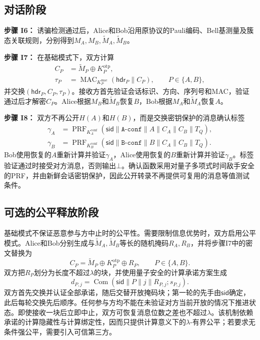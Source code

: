 \documentclass[UTF8,10pt,a4paper]{ctexart}
\theoremstyle{aqdplain}
\newcommand{\sid}{\mathsf{sid}}
\newcommand{\concat}{\mathbin{\|}}
\newcommand{\abort}{\bot}
\begin{document}
\subsection{对话阶段}

\textbf{步骤 I6：} 诱骗检测通过后，Alice和Bob沿用原协议的Pauli编码、Bell基测量及簇态关联规则，分别得到$M_A,M_B,\widetilde M_A,\widetilde M_B$。

\textbf{步骤 I7：} 在基础模式下，双方计算
\begin{align}
C_P&=\widetilde M_P\oplus K_P^{\mathrm{otp}},\nonumber\\
\tau_P&=\operatorname{MAC}_{K_P^{\mathrm{mac}}}
(\mathsf{hdr}_P\concat C_P),
\qquad P\in\{A,B\},
\label{eq:records}
\end{align}
并交换$(\mathsf{hdr}_P,C_P,\tau_P)$。接收方首先验证会话标识、方向、序列号和MAC，验证通过后才解密$C_P$。Alice根据$M_B$和$\widetilde M_B$恢复$B$，Bob根据$M_A$和$\widetilde M_A$恢复$A$。

\textbf{步骤 I8：} 双方不再公开$H(A)$和$H(B)$，而是交换密钥保护的消息确认标签
\begin{align}
\gamma_A&=\operatorname{PRF}_{K_A^{\mathrm{conf}}}
(\sid\concat\mathtt{A\mbox{-}conf}\concat A
\concat C_A\concat C_B\concat T_Q),\nonumber\\
\gamma_B&=\operatorname{PRF}_{K_B^{\mathrm{conf}}}
(\sid\concat\mathtt{B\mbox{-}conf}\concat B
\concat C_A\concat C_B\concat T_Q).
\label{eq:confirmation}
\end{align}
Bob使用恢复的$A$重新计算并验证$\gamma_A$，Alice使用恢复的$B$重新计算并验证$\gamma_B$。标签验证通过时接受对方消息，否则输出$\abort$。确认函数采用对量子多项式时间敌手安全的PRF，并由新鲜会话密钥保护，因此公开转录不再提供可复用的消息等值测试条件。

\subsection{可选的公平释放阶段}

基础模式不保证恶意参与方中止时的公平性。需要限制信息优势时，双方启用公平模式。Alice和Bob分别生成与$\widetilde M_A,\widetilde M_B$等长的随机掩码$R_A,R_B$，并将步骤I7中的密文替换为
\begin{equation}
C_P=\widetilde M_P\oplus K_P^{\mathrm{otp}}\oplus R_P,
\qquad P\in\{A,B\}.
\label{eq:masked-records}
\end{equation}
双方把$R_P$划分为长度不超过$\lambda$的块，并使用量子安全的计算承诺方案生成
\begin{equation}
d_{P,j}=\operatorname{Com}
(\sid\concat P\concat j\concat R_{P,j};s_{P,j}).
\label{eq:commitment}
\end{equation}
双方首先交换并认证全部承诺，随后交替开放掩码块；第一轮的先手由$\sid$确定，此后每轮交换先后顺序。任何参与方均不能在未验证对方当前开放的情况下推进状态。即使接收一块后立即中止，双方可恢复消息位数之差也不超过$\lambda$。该机制依赖承诺的计算隐藏性与计算绑定性，因而只提供计算意义下的$\lambda$-有界公平；若要求无条件强公平，需要引入可信第三方。
\end{document}
